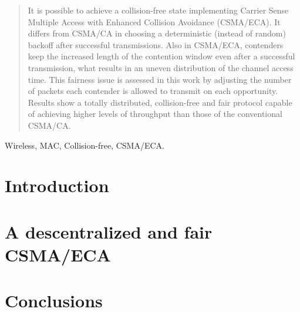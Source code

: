 \documentclass[conference]{IEEEtran}
\begin{document}
\begin{abstract}

\boldmath It is possible to achieve a collision-free state implementing Carrier Sense Multiple Access with Enhanced Collision Avoidance (CSMA/ECA). It differs from CSMA/CA in choosing a deterministic (instead of random) backoff after successful transmissions. Also in CSMA/ECA, contenders keep the increased length of the contention window even after a successful transmission, what results in an uneven distribution of the channel access time. This fairness issue is assessed in this work by adjusting the number of packets each contender is allowed to transmit on each opportunity. Results show a totally distributed, collision-free and fair protocol capable of achieving higher levels of throughput than those of the conventional CSMA/CA.



\end{abstract}

\begin{IEEEkeywords}
Wireless, MAC, Collision-free, CSMA/ECA.
\end{IEEEkeywords}

\section{Introduction} \label{introduction}
  

\section{A descentralized and fair CSMA/ECA} \label{csmae2ca}
  

\section{Conclusions} \label{conclusions}
  
  


  
\end{document}
